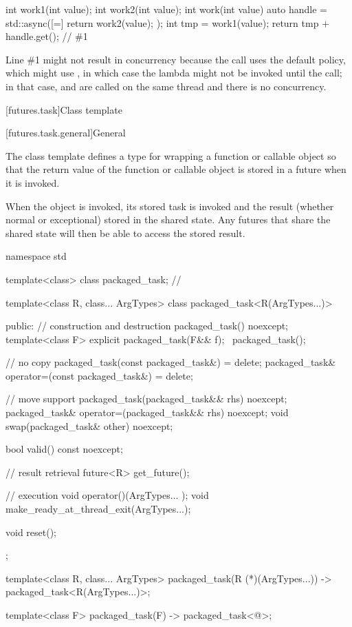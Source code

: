 \pnum
\begin{example}
\begin{codeblock}
int work1(int value);
int work2(int value);
int work(int value) {
  auto handle = std::async([=]{ return work2(value); });
  int tmp = work1(value);
  return tmp + handle.get();    // \#1
}
\end{codeblock}

\begin{note}
Line \#1 might not result in concurrency because
the  call uses the default policy, which might use
, in which case the lambda might not be invoked until the
 call; in that case,  and  are called on the
same thread and there is no concurrency.
\end{note}
\end{example}

[futures.task]{Class template }

[futures.task.general]{General}

\pnum
The class template  defines a type for wrapping a function or
callable object so that the return value of the function or callable object is stored in
a future when it is invoked.

\pnum
When the  object is invoked, its stored task is invoked and the
result (whether normal or exceptional) stored in the shared state. Any futures that
share the shared state will then be able to access the stored result.

%
\begin{codeblock}
namespace std {
  template<class> class packaged_task;  // \notdef

  template<class R, class... ArgTypes>
  class packaged_task<R(ArgTypes...)> {
  public:
    // construction and destruction
    packaged_task() noexcept;
    template<class F>
      explicit packaged_task(F&& f);
    ~packaged_task();

    // no copy
    packaged_task(const packaged_task&) = delete;
    packaged_task& operator=(const packaged_task&) = delete;

    // move support
    packaged_task(packaged_task&& rhs) noexcept;
    packaged_task& operator=(packaged_task&& rhs) noexcept;
    void swap(packaged_task& other) noexcept;

    bool valid() const noexcept;

    // result retrieval
    future<R> get_future();

    // execution
    void operator()(ArgTypes... );
    void make_ready_at_thread_exit(ArgTypes...);

    void reset();
  };

  template<class R, class... ArgTypes>
    packaged_task(R (*)(ArgTypes...)) -> packaged_task<R(ArgTypes...)>;

  template<class F> packaged_task(F) -> packaged_task<@\seebelow@>;
}
\end{codeblock}

